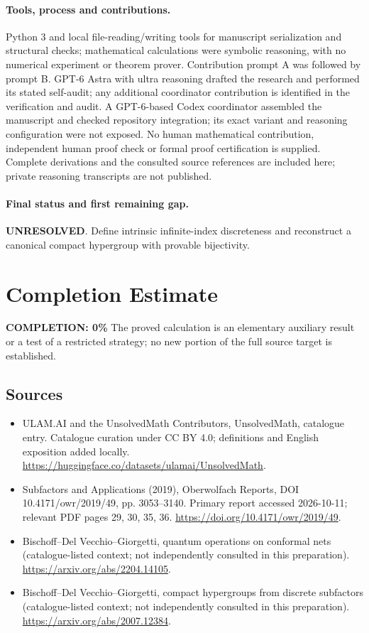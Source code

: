 \documentclass[11pt]{article}
\begin{document}
\paragraph{Tools, process and contributions.}
Python 3 and local file-reading/writing tools for manuscript serialization and structural checks; mathematical calculations were symbolic reasoning, with no numerical experiment or theorem prover. Contribution prompt A was followed by prompt B. GPT-6 Astra with ultra reasoning drafted the research and performed its stated self-audit; any additional coordinator contribution is identified in the verification and audit. A GPT-6-based Codex coordinator assembled the manuscript and checked repository integration; its exact variant and reasoning configuration were not exposed. No human mathematical contribution, independent human proof check or formal proof certification is supplied. Complete derivations and the consulted source references are included here; private reasoning transcripts are not published.

\paragraph{Final status and first remaining gap.}
\textbf{UNRESOLVED}. Define intrinsic infinite-index discreteness and reconstruct a canonical compact hypergroup with provable bijectivity.

\section{Completion Estimate}
\noindent\textbf{COMPLETION: 0\%}
The proved calculation is an elementary auxiliary result or a test of a restricted strategy; no new portion of the full source target is established.

\subsection{Sources}
\begin{itemize}
\item[\hypertarget{source:statement:1}{S1}] ULAM.AI and the UnsolvedMath Contributors, UnsolvedMath, catalogue entry. Catalogue curation under CC BY 4.0; definitions and English exposition added locally.
\url{https://huggingface.co/datasets/ulamai/UnsolvedMath}.
\item[\hypertarget{source:statement:2}{S2}] Subfactors and Applications (2019), Oberwolfach Reports, DOI 10.4171/owr/2019/49, pp. 3053--3140. Primary report accessed 2026-10-11; relevant PDF pages 29, 30, 35, 36.
\url{https://doi.org/10.4171/owr/2019/49}.
\item[\hypertarget{source:statement:3}{S3}] Bischoff--Del Vecchio--Giorgetti, quantum operations on conformal nets (catalogue-listed context; not independently consulted in this preparation).
\url{https://arxiv.org/abs/2204.14105}.
\item[\hypertarget{source:statement:4}{S4}] Bischoff--Del Vecchio--Giorgetti, compact hypergroups from discrete subfactors (catalogue-listed context; not independently consulted in this preparation).
\url{https://arxiv.org/abs/2007.12384}.
\end{itemize}
\label{end:statement}
\end{document}
